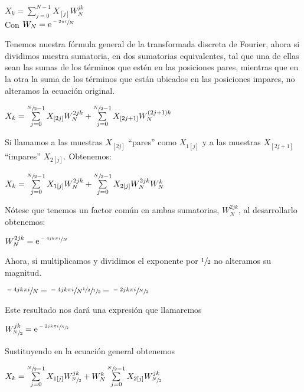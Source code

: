 \documentclass[a4paper]{article}
\begin{document}
\begin{center}
$X_{k} = \sum \limits_{j=0}^{N - 1} X_{[j]} W_{N}^{jk}$\\
Con $W_{N} = \mathrm{e}^{\sfrac{-2\pi i}{N}}$
\end{center}

Tenemos nuestra fórmula general de la transformada discreta de Fourier, ahora si dividimos nuestra sumatoria, en dos sumatorias equivalentes, tal que una de ellas sean las sumas de los términos que estén en las posiciones pares, mientras que en la otra la suma de los términos que están ubicados en las posiciones impares, no alteramos la ecuación original.

\begin{center}
$ X_{k} = \sum \limits_{j=0}^{\sfrac{N}{2} - 1} X_{[2j]} W_{N}^{2jk} + \sum \limits_{j=0}^{\sfrac{N}{2} - 1} X_{[2j+1]} W_{N}^{(2j+1)k}$
\end{center}

Si llamamos a las muestras $X_{[2j]}$ “pares” como $X_{1[j]}$ y  a las muestras $X_{[2j+1]}$ “impares” $X_{2[j]}$. Obtenemos:

\begin{center}
$ X_{k} = \sum \limits_{j=0}^{\sfrac{N}{2} - 1} X_{1[j]} W_{N}^{2jk} + \sum \limits_{j=0}^{\sfrac{N}{2} - 1} X_{2[j]} W_{N}^{2jk} W_{N}^{k}$
\end{center}

Nótese que tenemos un factor común en ambas sumatorias, $W_{N}^{2jk}$, al desarrollarlo obtenemos:

\begin{center}
$W_{N}^{2jk} = \mathrm{e}^{\sfrac{-4jk\pi i}{N}}$
\end{center}

Ahora, si multiplicamos y dividimos el exponente por $\sfrac{1}{2}$ no alteramos su magnitud.

\begin{center}
$\sfrac{-4jk\pi i}{N} = \sfrac{-4jk\pi i}{N} \sfrac{\sfrac{1}{2}}{\sfrac{1}{2}} = \sfrac{-2jk\pi i}{\sfrac{N}{2}}$
\end{center}

Este resultado nos dará una expresión que llamaremos 

\begin{center}
$W_{\sfrac{N}{2}}^{jk} = \mathrm{e}^{\sfrac{-2jk\pi i}{\sfrac{N}{2}}}$
\end{center}

Sustituyendo en la ecuación general obtenemos

\begin{center}
$ X_{k} = \sum \limits_{j=0}^{\sfrac{N}{2} - 1} X_{1[j]} W_{\sfrac{N}{2}}^{jk} + W_{N}^{k} \sum \limits_{j=0}^{\sfrac{N}{2} - 1} X_{2[j]} W_{\sfrac{N}{2}}^{jk}$
\end{center}
\end{document}
